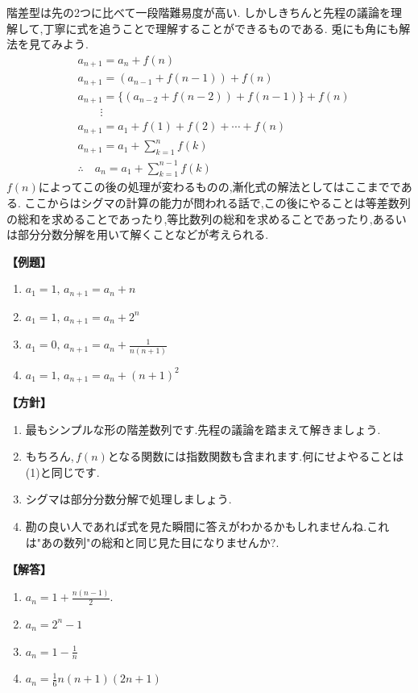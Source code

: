 
階差型は先の2つに比べて一段階難易度が高い.
しかしきちんと先程の議論を理解して,丁寧に式を追うことで理解することができるものである.
兎にも角にも解法を見てみよう.
\begin{align*}
   & a_{n+1}=a_n+f(n)                               \\
   & a_{n+1}=(a_{n-1}+f(n-1))+f(n)                  \\
   & a_{n+1}=\{(a_{n-2}+f(n-2))+f(n-1)\}+f(n)       \\
   & \qquad \vdots                                  \\
   & a_{n+1}=a_1+f(1)+f(2)+\cdots+f(n)              \\
   & a_{n+1}=a_1+\sum_{k=1}^{n} f(k)                \\
   & \therefore \quad a_n=a_1+\sum_{k=1}^{n-1} f(k)
\end{align*}
$f(n)$によってこの後の処理が変わるものの,漸化式の解法としてはここまでである.
ここからはシグマの計算の能力が問われる話で,この後にやることは等差数列の総和を求めることであったり,等比数列の総和を求めることであったり,あるいは部分分数分解を用いて解くことなどが考えられる.

\noindent \textbf{【例題】}
\begin{enumerate}[label=(\arabic*),parsep=3pt]
  \item $\displaystyle a_1=1,\, a_{n+1}=a_n+n$
  \item $\displaystyle a_1=1,\, a_{n+1}=a_n+2^n$
  \item $\displaystyle a_1=0,\, a_{n+1}=a_n+\frac{1}{n(n+1)}$
  \item $\displaystyle a_1=1,\, a_{n+1}=a_n+(n+1)^2$
\end{enumerate}

\noindent\textbf{【方針】}
\begin{enumerate}[label=(\arabic*),parsep=3pt]
  \item 最もシンプルな形の階差数列です.先程の議論を踏まえて解きましょう.
  \item もちろん,\,$f(n)$となる関数には指数関数も含まれます.何にせよやることは\,(1)と同じです.
  \item シグマは部分分数分解で処理しましょう.
  \item 勘の良い人であれば式を見た瞬間に答えがわかるかもしれませんね.これは"あの数列"の総和と同じ見た目になりませんか?.
\end{enumerate}

\noindent\textbf{【解答】}
\begin{enumerate}[label=(\arabic*),parsep=3pt]
  \item $\displaystyle a_n=1+\frac{n(n-1)}{2}.$
  \item $\displaystyle a_n=2^n-1$
  \item $\displaystyle a_n=1-\frac{1}{n}$
  \item $\displaystyle a_n=\frac{1}{6}n(n+1)(2n+1)$
\end{enumerate}

